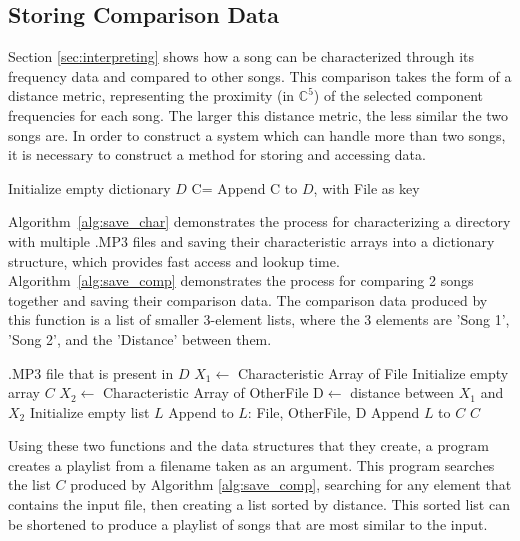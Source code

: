 \documentclass[conference]{IEEEtran}
\begin{document}
\subsection{Storing Comparison Data}\label{sec:storing}
Section \eqref{sec:interpreting} shows how a song can be characterized through its frequency data and compared to other songs. This comparison takes the form of a distance metric, representing the proximity (in $\mathbb{C}^5$) of the selected component frequencies for each song. The larger this distance metric, the less similar the two songs are. In order to construct a system which can handle more than two songs, it is necessary to construct a method for storing and accessing data.
\begin{algorithm}
  \caption{Saving Song Characterizations}\label{alg:save_char}
  \begin{algorithmic}
    \State Initialize empty dictionary $D$
    \EndIf
    \State C=
    \State Append C to $D$, with File as key
    \State {}
    \EndIf
    \EndFor
    \State {}
    \EndFunction
  \end{algorithmic}
\end{algorithm}
Algorithm~\eqref{alg:save_char} demonstrates the process for characterizing a directory with multiple .MP3 files and saving their characteristic arrays into a dictionary structure, which provides fast access and lookup time. Algorithm~\eqref{alg:save_comp} demonstrates the process for comparing 2 songs together and saving their comparison data. The comparison data produced by this function is a list of smaller 3-element lists, where the 3 elements are 'Song 1', 'Song 2', and the 'Distance' between them.
\begin{algorithm}
  \caption{Saving Song Comparisons}\label{alg:save_comp}
  \begin{algorithmic}
    \Require .MP3 file that is present in $D$
    \State $X_1\gets$ Characteristic Array of File
    \State Initialize empty array $C$
    \EndIf
    \State $X_2\gets$ Characteristic Array of OtherFile
    \State D$\gets$ distance between $X_1$ and $X_2$
    \State Initialize empty list $L$
    \State Append to $L$: File, OtherFile, D
    \State Append $L$ to $C$
    \EndIf
    \EndFor
    \State \Return $C$
    \EndFunction
  \end{algorithmic}
\end{algorithm}
Using these two functions and the data structures that they create, a program creates a playlist from a filename taken as an argument. This program searches the list $C$ produced by Algorithm \eqref{alg:save_comp}, searching for any element that contains the input file, then creating a list sorted by distance. This sorted list can be shortened to produce a playlist of songs that are most similar to the input.
\end{document}
